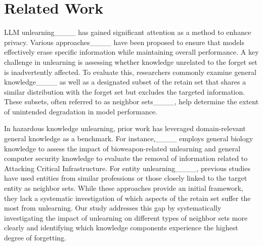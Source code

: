 \section{Related Work}
LLM unlearning____ has gained significant attention as a method to enhance privacy. Various approaches____ have been proposed to ensure that models effectively erase specific information while maintaining overall performance. A key challenge in unlearning is assessing whether knowledge unrelated to the forget set is inadvertently affected. To evaluate this, researchers commonly examine general knowledge____ as well as a designated subset of the retain set that shares a similar distribution with the forget set but excludes the targeted information. These subsets, often referred to as neighbor sets____, help determine the extent of unintended degradation in model performance.

In hazardous knowledge unlearning, prior work has leveraged domain-relevant general knowledge as a benchmark. For instance,____ employs general biology knowledge to assess the impact of bioweapon-related unlearning and general computer security knowledge to evaluate the removal of information related to Attacking Critical Infrastructure. For entity unlearning____, previous studies have used entities from similar professions or those closely linked to the target entity as neighbor sets. While these approaches provide an initial framework, they lack a systematic investigation of which aspects of the retain set suffer the most from unlearning. Our study addresses this gap by systematically investigating the impact of unlearning on different types of neighbor sets more clearly and identifying which knowledge components experience the highest degree of forgetting.
